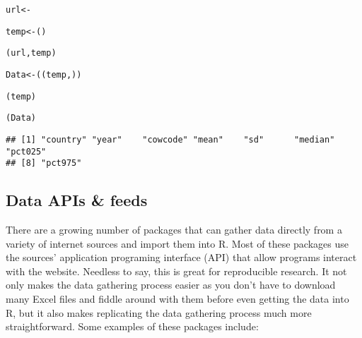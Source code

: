 {\footnotesize
\begin{knitrout}
\color{fgcolor}\begin{kframe}
\begin{alltt}
url <- 

temp <- ()

(url, temp)

Data <- ((temp, ))

(temp)

(Data)
\end{alltt}
\begin{verbatim}
## [1] "country" "year"    "cowcode" "mean"    "sd"      "median"  "pct025" 
## [8] "pct975"
\end{verbatim}
\end{kframe}
\end{knitrout}

}

\subsection{Data APIs \& feeds}

There are a growing number of packages that can gather data directly from a variety of internet sources and import them into R. Most of these packages use the sources' application programing interface (API) that allow programs interact with the website. Needless to say, this is great for reproducible research. It not only makes the data gathering process easier as you don't have to download many Excel files and fiddle around with them before even getting the data into R, but it also makes replicating the data gathering process much more straightforward. Some examples of these packages include: 

